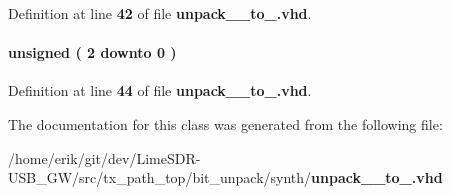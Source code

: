 Definition at line {\bf 42} of file {\bf unpack\+\_\+\_\+to\+\_.\+vhd}.

\paragraph[{wr\+\_\+cnt}]{ {\bfseries \textcolor{comment}{unsigned}\textcolor{vhdlchar}{ }\textcolor{vhdlchar}{(}\textcolor{vhdlchar}{ }\textcolor{vhdlchar}{ } \textcolor{vhdldigit}{2} \textcolor{vhdlchar}{ }\textcolor{keywordflow}{downto}\textcolor{vhdlchar}{ }\textcolor{vhdlchar}{ } \textcolor{vhdldigit}{0} \textcolor{vhdlchar}{ }\textcolor{vhdlchar}{)}\textcolor{vhdlchar}{ }} \hspace{0.3cm}{\ttfamily [Signal]}}\label{classunpack__64__to__56_1_1arch_aa258e6ca26dfabaf42c5c6bdca094421}


Definition at line {\bf 44} of file {\bf unpack\+\_\+\_\+to\+\_.\+vhd}.



The documentation for this class was generated from the following file\+:\begin{DoxyCompactItemize}
\item 
/home/erik/git/dev/\+Lime\+S\+D\+R-\/\+U\+S\+B\+\_\+\+G\+W/src/tx\+\_\+path\+\_\+top/bit\+\_\+unpack/synth/{\bf unpack\+\_\+\_\+to\+\_.\+vhd}\end{DoxyCompactItemize}
